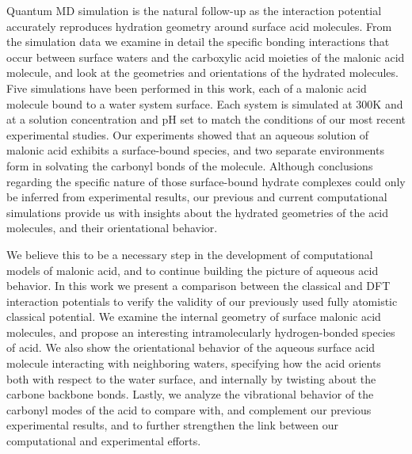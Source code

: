 Quantum MD simulation is the natural follow-up as the interaction potential accurately reproduces hydration geometry around surface acid molecules. From the simulation data we examine in detail the specific bonding interactions that occur between surface waters and the carboxylic acid moieties of the malonic acid molecule, and look at the geometries and orientations of the hydrated molecules. Five simulations have been performed in this work, each of a malonic acid molecule bound to a water system surface. Each system is simulated at 300K and at a solution concentration and pH set to match the conditions of our most recent experimental studies. Our experiments showed that an aqueous solution of malonic acid exhibits a surface-bound species, and two separate environments form in solvating the carbonyl bonds of the molecule. Although conclusions regarding the specific nature of those surface-bound hydrate complexes could only be inferred from experimental results, our previous and current computational simulations provide us with insights about the hydrated geometries of the acid molecules, and their orientational behavior.

We believe this to be a necessary step in the development of computational models of malonic acid, and to continue building the picture of aqueous acid behavior. In this work we present a comparison between the classical and DFT interaction potentials to verify the validity of our previously used fully atomistic classical potential. We examine the internal geometry of surface malonic acid molecules, and propose an interesting intramolecularly hydrogen-bonded species of acid. We also show the orientational behavior of the aqueous surface acid molecule interacting with neighboring waters, specifying how the acid orients both with respect to the water surface, and internally by twisting about the carbone backbone bonds. Lastly, we analyze the vibrational behavior of the carbonyl modes of the acid to compare with, and complement our previous experimental results, and to further strengthen the link between our computational and experimental efforts.
